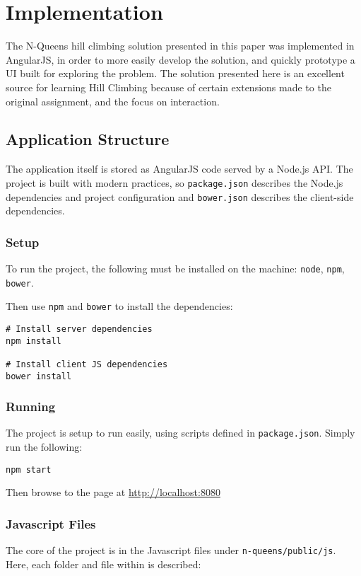 \section{Implementation}
\label{section:implementation}
The N-Queens hill climbing solution presented in this paper was implemented in AngularJS, in order to more easily
develop the solution, and quickly prototype a UI built for exploring the problem. The solution presented here is an
excellent source for learning Hill Climbing because of certain extensions made to the original assignment, and the
focus on interaction.

\subsection{Application Structure}
The application itself is stored as AngularJS code served by a Node.js API. The project is built with modern practices,
so \texttt{package.json} describes the Node.js dependencies and project configuration and \texttt{bower.json} describes
the client-side dependencies.

\subsubsection{Setup}
To run the project, the following must be installed on the machine:
\texttt{node}\cite{node}, \texttt{npm}\cite{npm}, \texttt{bower}\cite{bower}.

Then use \texttt{npm} and \texttt{bower} to install the dependencies:

\begin{lstlisting}
# Install server dependencies
npm install

# Install client JS dependencies
bower install
\end{lstlisting}

\subsubsection{Running}
The project is setup to run easily, using scripts defined in \texttt{package.json}. Simply run the following:

\begin{lstlisting}
npm start
\end{lstlisting}

Then browse to the page at \url{http://localhost:8080}

\subsubsection{Javascript Files}
The core of the project is in the Javascript files under \texttt{n-queens/public/js}. Here, each folder and file within
is described:

